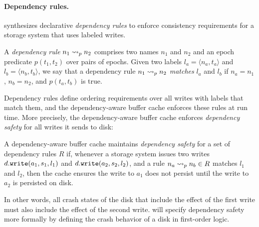 \paragraph{Dependency rules.}

\depsynth synthesizes declarative \emph{dependency rules}
to enforce consistency requirements for a storage system that uses labeled writes.
%
\begin{definition}\label{def:dependency-rule}
A \emph{dependency rule} $\deprule{n_1}{n_2}{p}$
comprises two names $n_1$ and $n_2$ and an epoch predicate $p(t_1, t_2)$ over pairs of epochs.
Given two labels
$l_a = \langle n_a, t_a \rangle$
and
$l_b = \langle n_b, t_b \rangle$,
we say that a dependency rule $\deprule{n_1}{n_2}{p}$
\emph{matches} $l_a$ and $l_b$
if $n_a = n_1$, $n_b = n_2$, and $p(t_a, t_b)$ is true.
\end{definition}

\noindent
Dependency rules define ordering requirements over all writes with labels that match them,
and the dependency-aware buffer cache enforces these rules at run time.
More precisely, the dependency-aware buffer cache enforces \emph{dependency safety}
for all writes it sends to disk:
%
\begin{definition}\label{def:dependency-safety}
A dependency-aware buffer cache maintains
\emph{dependency safety} for a set of dependency rules $R$ if,
whenever a storage system issues two writes
$d.{\tt write}(a_1, s_1, l_1)$ and
$d.{\tt write}(a_2, s_2, l_2)$,
and a rule $\deprule{n_a}{n_b}{p} \in R$ matches $l_1$ and $l_2$,
then the cache ensures the write to $a_1$ does not persist until the write to $a_2$ is persisted on disk.
\end{definition}
%
\noindent
In other words, all crash states of the disk that include the effect of the first write
must also include the effect of the second write.
 will specify dependency safety more formally
by defining the crash behavior of a disk in first-order logic. 

